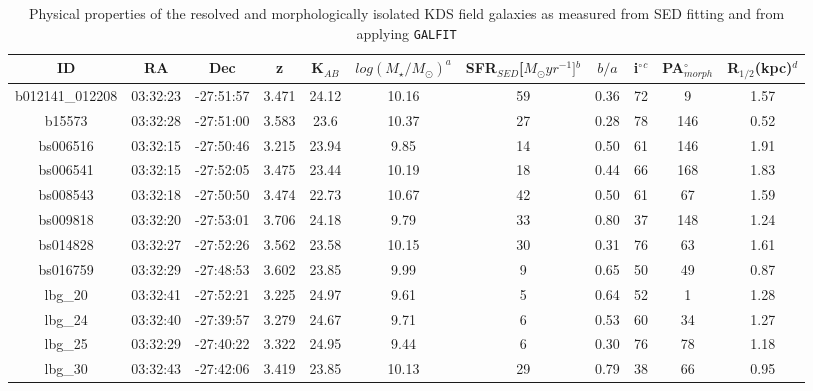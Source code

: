 \documentclass[fleqn,usenatbib]{mn2e}
\begin{document}
\begin{table*}
\centering
\begin{threeparttable}
\caption{Physical properties of the resolved and morphologically isolated KDS field galaxies as measured from SED fitting and from applying {\tt GALFIT} \protect\citep{Peng2010_galfit}}
\label{tab:phys-props}
\begin{tabular}{ccccccccccc}


 \hline
ID              & RA       & Dec       & z     & K$_{AB}$     & $log(M_{\star}/M_{\odot})^{a}$ & SFR$_{SED}$[$M_{\odot}yr^{-1}]$$^{b}$ & $b/a$ & i$^{\circ}$$^{c}$ & PA$_{morph}^{\circ}$ & R$_{1/2}$(kpc)$^{d}$ \\
 \hline
b012141\_012208 & 03:32:23 & -27:51:57 & 3.471        & 24.12  & 10.16 & 59 & 0.36        & 72        & 9     & 1.57      \\
b15573          & 03:32:28 & -27:51:00 & 3.583        & 23.6   & 10.37 & 27 & 0.28        & 78        & 146   & 0.52      \\
bs006516        & 03:32:15 & -27:50:46 & 3.215        & 23.94  & 9.85  & 14 & 0.50         & 61        & 146   & 1.91      \\
bs006541        & 03:32:15 & -27:52:05 & 3.475       & 23.44  & 10.19 & 18 & 0.44        & 66        & 168   & 1.83      \\
bs008543        & 03:32:18 & -27:50:50 & 3.474        & 22.73  & 10.67 & 42 & 0.50         & 61        & 67    & 1.59      \\
bs009818        & 03:32:20 & -27:53:01 & 3.706        & 24.18  & 9.79  & 33 & 0.80         & 37        & 148   & 1.24      \\
bs014828        & 03:32:27 & -27:52:26 & 3.562        & 23.58  & 10.15 & 30 & 0.31        & 76        & 63    & 1.61      \\
bs016759        & 03:32:29 & -27:48:53 & 3.602       & 23.85  & 9.99  & 9  & 0.65        & 50        & 49    & 0.87      \\
lbg\_20         & 03:32:41 & -27:52:21 & 3.225        & 24.97  & 9.61  & 5  & 0.64        & 52        & 1     & 1.28      \\
lbg\_24         & 03:32:40 & -27:39:57 & 3.279       & 24.67  & 9.71  & 6  & 0.53        & 60        & 34    & 1.27      \\
lbg\_25         & 03:32:29 & -27:40:22 & 3.322        & 24.95  & 9.44  & 6  & 0.30         & 76        & 78    & 1.18      \\
lbg\_30         & 03:32:43 & -27:42:06 & 3.419        & 23.85  & 10.13  & 29  & 0.79         & 38        & 66    & 0.95      \\

\end{tabular}
\end{threeparttable}
\end{table*}
\end{document}
